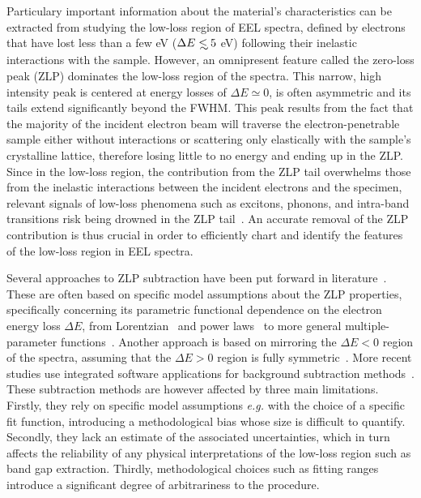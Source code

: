 Particulary important information about the material's characteristics can be extracted from studying the
low-loss region of EEL spectra,
defined by electrons that have lost
less than a few eV ($\Delta E\lsim 5$ eV) following their inelastic interactions
with the sample.
%
However, an omnipresent feature called the zero-loss peak (ZLP) dominates
the low-loss region of the spectra. 
%
This narrow, high intensity peak is centered at energy losses
of $\Delta E\simeq 0$, is often asymmetric and its tails extend significantly 
beyond the FWHM. 
%
This peak results from the fact that 
the majority of the incident electron beam will traverse the electron-penetrable sample
either without interactions or scattering only elastically with the 
sample's crystalline lattice, therefore losing little to no energy
and ending up in the ZLP.
%
Since in the low-loss region, the contribution from the ZLP tail
overwhelms those from the inelastic interactions between
the incident electrons and the specimen,
relevant signals of low-loss phenomena such as excitons,
phonons, and intra-band transitions risk being drowned
in the ZLP tail~\cite{Abajo:2010}.
%
An accurate removal of the ZLP
contribution is thus crucial in order to efficiently chart and identify the features
of the low-loss region in EEL spectra. 


Several approaches to ZLP subtraction have been put forward in 
literature~\cite{Rafferty:2000, Erni:2005, Stoger:2008, Egerton:1996,Dorneich:1998, Benthem:2001, Lazar:2003}.
%
These are often based on specific model assumptions about the ZLP properties, specifically
concerning its parametric functional dependence on the electron energy loss $\Delta E$,
from Lorentzian~\cite{Dorneich:1998}
and power laws~\cite{Erni:2005} to more general multiple-parameter functions~\cite{Benthem:2001}.
%
Another approach is based on mirroring the $\Delta E <0$ region of the spectra, assuming
that the $\Delta E>0$ region is fully symmetric~\cite{Lazar:2003}.
%
More recent studies use integrated software applications for background subtraction 
methods~\cite{Egerton:10.1016/S0304-3991(01)00155-3, Held:2020, Granerod:2018, Fung:2020}.
%
These subtraction methods are however affected by three main limitations.
%
Firstly, they rely on specific model assumptions {\it e.g.} with
the choice of a specific fit function, introducing a methodological
bias whose size is difficult to quantify.
%
Secondly, they lack an estimate of the associated uncertainties, which in turn affects
the reliability of any physical interpretations of the low-loss region such as
band gap extraction.
%
Thirdly, methodological choices such as fitting ranges introduce a significant degree of
arbitrariness to the procedure.\\

